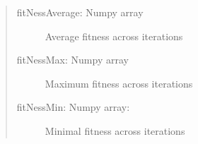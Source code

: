 \documentclass[letterpaper,10pt,english]{sphinxmanual}
\begin{document}
\begin{fulllineitems}
\begin{quote}
\begin{description}
\begin{description}
\item[{fitNessAverage: Numpy array}] \leavevmode
Average fitness across iterations

\item[{fitNessMax: Numpy array}] \leavevmode
Maximum fitness across iterations

\item[{fitNessMin: Numpy array:}] \leavevmode
Minimal fitness across iterations

\end{description}


\end{description}\end{quote}

\end{fulllineitems}

\end{document}
